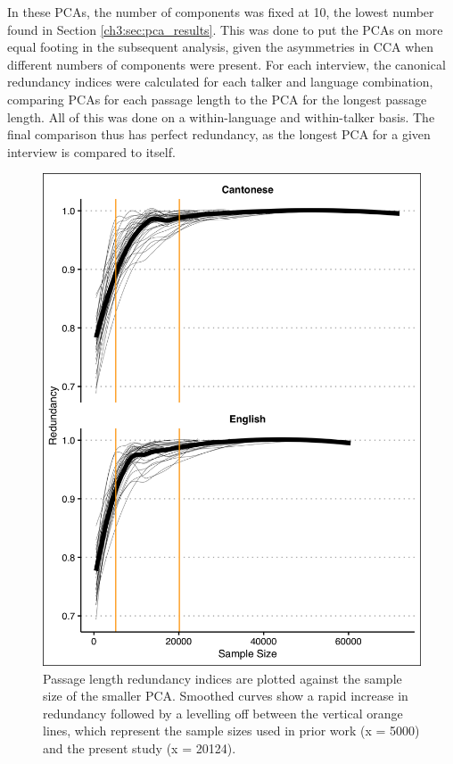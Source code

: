In these PCAs, the number of components was fixed at 10, the lowest number found in Section \ref{ch3:sec:pca_results}. This was done to put the PCAs on more equal footing in the subsequent analysis, given the asymmetries in CCA when different numbers of components were present. For each interview, the canonical redundancy indices were calculated for each talker and language combination, comparing PCAs for each passage length to the PCA for the longest passage length. All of this was done on a within-language and within-talker basis. The final comparison thus has perfect redundancy, as the longest PCA for a given interview is compared to itself.

\begin{figure}[htbp]
    \begin{center}
    \includegraphics[width=0.75\linewidth]{figures/ch3_passagelength.png} 
    \caption{Passage length redundancy indices are plotted against the sample size of the smaller PCA. Smoothed curves show a rapid increase in redundancy followed by a levelling off between the vertical orange lines, which represent the sample sizes used in prior work (x = 5000) and the present study (x = 20124).}
    \label{ch3:fig:passagelength}
    \end{center}
\end{figure}

